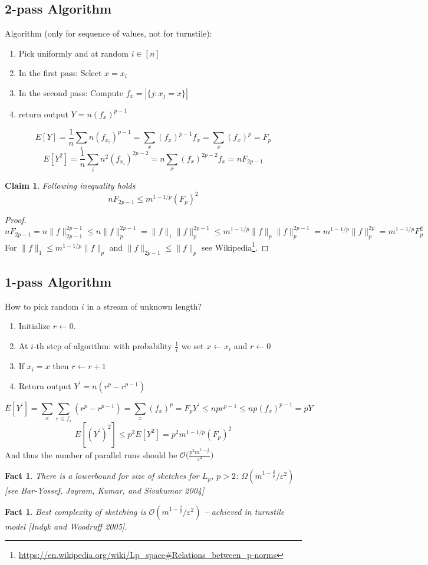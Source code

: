 \documentclass[11pt]{article}
\newtheorem{claim}[theorem]{Claim}
\newtheorem{fact}[theorem]{Fact}
\begin{document}
\subsection{2-pass Algorithm}
Algorithm (only for sequence of values, not for turnstile):
  \begin{enumerate}
    \item Pick uniformly and at random $i \in [n]$
    \item In the first pass: Select $x = x_i$
    \item In the second pass: Compute $f_{x} = |\{ j : x_j = x \}|$
    \item return output $Y = n (f_x)^{p-1}$
  \end{enumerate}
$$E[Y] = \frac{1}{n}\sum_{i} n(f_{x_i})^{p-1} = \sum_{x} (f_x)^{p-1} f_x = \sum_{x} (f_x)^p = F_p$$
$$E[Y^2] = \frac{1}{n}\sum_{i}n^2 (f_{x_i})^{2p-2} = n \sum_{x} (f_x)^{2p-2} f_x = n F_{2p-1}$$

\begin{claim}
  Following inequality holds $$n F_{2p-1} \leq m^{1-1/p} (F_p)^2$$
\end{claim}
\begin{proof}
$$nF_{2p-1} = n \|f\|_{2p-1}^{2p-1} \leq n \|f\|_{p}^{2p-1} = \|f\|_1 \|f\|_p^{2p-1} \leq m^{1 - 1/p} \|f\|_p \|f\|_p^{2p-1} = m^{1 - 1/p} \|f\|_p^{2p} = m^{1 - 1/p} F_p^2$$
For $\|f\|_1 \leq m^{1 - 1/p} \|f\|_p$ and $\|f\|_{2p-1} \le \|f\|_p$ see Wikipedia\footnote{\url{https://en.wikipedia.org/wiki/Lp_space#Relations_between_p-norms}}.
\end{proof}
\subsection{1-pass Algorithm}
How to pick random $i$ in a stream of unknown length?
\begin{enumerate}
  \item Initialize $r \gets 0$.
  \item At $i$-th step of algorithm: with probability $\frac{1}{i}$ we set $x \gets x_i$ and $r \gets 0$
  \item If $x_{i} = x$ then $r \gets r + 1$
  \item Return output $Y^\prime = n(r^p - r^{p-1})$
\end{enumerate}
$$E[Y^\prime] = \sum_x \sum_{r \leq f_x} (r^p-r^{p-1}) = \sum_x (f_x)^p = F_p
Y^\prime \leq n p r^{p-1} \leq n p (f_x)^{p-1} = p Y$$
$$E[(Y^\prime)^2] \leq p^2 E[Y^2] = p^2 m^{1-1/p} (F_p)^2$$
And thus the number of parallel runs should be $\mathcal{O}\Big(\frac{p^2 m^{1 - \frac{1}{p}}}{\varepsilon^2}\Big)$

\begin{fact}
  There is a lowerbound for size of sketches for $L_p$, $p > 2$: $\Omega(m^{1-\frac{2}{p}}/\varepsilon^2)$ [see Bar-Yossef, Jayram, Kumar, and Sivakumar 2004]
\end{fact}
\begin{fact}
  Best complexity of sketching is $\mathcal{O}(m^{1-\frac{2}{p}}/\varepsilon^2)$ -- achieved in turnstile model [Indyk and Woodruff 2005].
\end{fact}
\end{document}
